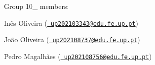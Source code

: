 Group 10\+\_ members\+:


\begin{DoxyEnumerate}
\item Inês Oliveira (\href{mailto:up202103343@edu.fe.up.pt}{\texttt{ up202103343@edu.\+fe.\+up.\+pt}})
\item João Oliveira (\href{mailto:up202108737@edu.fe.up.pt}{\texttt{ up202108737@edu.\+fe.\+up.\+pt}})
\item Pedro Magalhães (\href{mailto:up202108756@edu.fe.up.pt}{\texttt{ up202108756@edu.\+fe.\+up.\+pt}}) 
\end{DoxyEnumerate}
